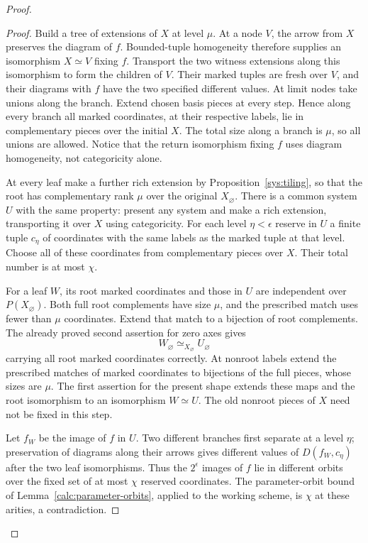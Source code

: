 \begin{proof}
\begin{proof}
Build a tree of extensions of $X$ at level $\mu$.  At a node $V$,
the arrow from $X$ preserves the diagram of $f$.  Bounded-tuple
homogeneity therefore supplies an isomorphism $X\simeq V$
fixing $f$.  Transport the two witness extensions along this
isomorphism to form the children of $V$.  Their marked tuples
are fresh over $V$, and their diagrams with $f$ have the two
specified different values.  At limit nodes take unions along
the branch.  Extend chosen basis pieces at every step.  Hence
along every branch all marked coordinates, at their respective
labels, lie in complementary pieces over the initial $X$.
The total size along a branch is $\mu$, so all unions are
allowed.  Notice that the return isomorphism fixing $f$ uses
diagram homogeneity, not categoricity alone.

At every leaf make a further rich extension by
Proposition~\ref{sys:tiling}, so that the root has complementary
rank $\mu$ over the original $X_\varnothing$.  There is a common
system $U$ with the same property: present any system and make a
rich extension, transporting it over $X$ using categoricity.
For each level $\eta<\epsilon$ reserve in $U$ a finite tuple
$c_\eta$ of coordinates with the same labels as the marked
tuple at that level.  Choose all of these coordinates from
complementary pieces over $X$.  Their total number is at most
$\chi$.

For a leaf $W$, its root marked coordinates and those in $U$
are independent over $P(X_\varnothing)$.  Both full root
complements have size $\mu$, and the prescribed match uses
fewer than $\mu$ coordinates.  Extend that match to a bijection
of root complements.  The already proved second assertion for
zero axes gives
\[
 W_\varnothing\simeq_{X_\varnothing}U_\varnothing
\]
carrying all root marked coordinates correctly.  At nonroot
labels extend the prescribed matches of marked coordinates to
bijections of the full pieces, whose sizes are $\mu$.  The
first assertion for the present shape extends these maps and
the root isomorphism to an isomorphism $W\simeq U$.
The old nonroot pieces of $X$ need not be fixed in this step.

Let $f_W$ be the image of $f$ in $U$.  Two different branches
first separate at a level $\eta$; preservation of diagrams
along their arrows gives different values of
$D(f_W,c_\eta)$ after the two leaf isomorphisms.  Thus the
$2^\epsilon$ images of $f$ lie in different orbits over the
fixed set of at most $\chi$ reserved coordinates.  The
parameter-orbit bound of Lemma~\ref{calc:parameter-orbits},
applied to the working scheme, is $\chi$ at
these arities, a contradiction.
\end{proof}


\end{proof}
